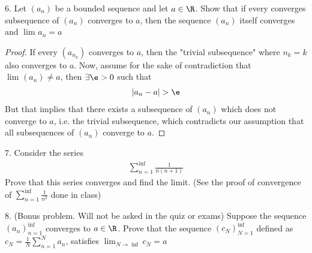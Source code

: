 6. Let $\left( a_n \right) $ be a bounded sequence and let $a \in \R$. Show that if every converges subsequence of $\left( a_n \right) $ converges to $a$, then the sequence $\left( a_n \right) $ itself converges and $\lim_{} a_n = a$

\begin{proof}
	If every $\left( a_{n_{k}} \right) $ converges to $a$, then the "trivial subsequence" where $n_{k} = k$ also converges to $a$. Now, assume for the sake of contradiction that $\lim_{}\left( a_n \right) \neq a$, then $\exists \e > 0$ such that 
	 \begin{align}
		\left|a_n - a\right| > \e 
	\end{align}
	But that implies that there exists  a subsequence of $\left( a_n \right) $ which does not converge to $a$, i.e. the trivial subsequence, which contradicts our assumption that all subsequences of $\left( a_n \right) $ converge to $a$.
\end{proof}
7. Consider the series 
\begin{align}
	\sum_{n=1}^{\inf } \frac{1}{n\left( n+1 \right) }
\end{align}
Prove that this series converges and find the limit. (See the proof of convergence of $\sum_{n=1}^{\inf } \frac{1}{n^{2}}$ done in class)

8. (Bonus problem. Will not be asked in the quiz or exams) Suppose the sequence $\left( a_n \right)_{n=1}^{\inf }$ converges to $a \in \R$. Prove that the sequence $\left( c_N \right)_{N=1}^{\inf }$ defined as $c_N = \frac{1}{N} \sum_{n=1}^{N} a_n$, satisfies $\lim_{N \to \inf } c_N = a$

